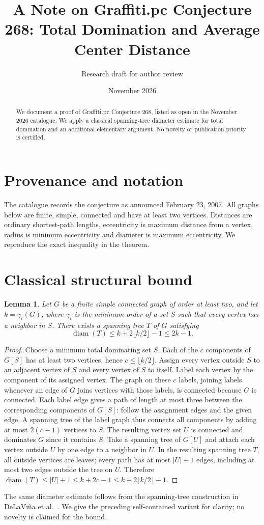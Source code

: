 \documentclass[11pt]{article}
\title{A Note on Graffiti.pc Conjecture 268: Total Domination and Average Center Distance}
\author{Research draft for author review}
\date{November 2026}
\newtheorem{lemma}{Lemma}
\begin{document}
\maketitle
\begin{abstract}
We document a proof of Graffiti.pc Conjecture 268, listed as open in the November 2026 catalogue. We apply a classical spanning-tree diameter estimate for total domination and an additional elementary argument. No novelty or publication priority is certified.
\end{abstract}
\section{Provenance and notation}
The catalogue \cite{wow} records the conjecture as announced February 23, 2007. All graphs below are finite, simple, connected and have at least two vertices. Distances are ordinary shortest-path lengths, eccentricity is maximum distance from a vertex, radius is minimum eccentricity and diameter is maximum eccentricity. We reproduce the exact inequality in the theorem.
\section{Classical structural bound}
\begin{lemma}
Let $G$ be a finite simple connected graph of order at least two, and let $k=\gamma_t(G)$, where $\gamma_t$ is the minimum order of a set $S$ such that every vertex has a neighbor in $S$. There exists a spanning tree $T$ of $G$ satisfying
\[
 \operatorname{diam}(T)\le k+2\lfloor k/2\rfloor-1\le 2k-1.
\]
\end{lemma}
\begin{proof}
Choose a minimum total dominating set $S$. Each of the $c$ components of $G[S]$ has at least two vertices, hence $c\le\lfloor k/2\rfloor$. Assign every vertex outside $S$ to an adjacent vertex of $S$ and every vertex of $S$ to itself. Label each vertex by the component of its assigned vertex. The graph on these $c$ labels, joining labels whenever an edge of $G$ joins vertices with those labels, is connected because $G$ is connected. Each label edge gives a path of length at most three between the corresponding components of $G[S]$: follow the assignment edges and the given edge. A spanning tree of the label graph thus connects all components by adding at most $2(c-1)$ vertices to $S$. The resulting vertex set $U$ is connected and dominates $G$ since it contains $S$. Take a spanning tree of $G[U]$ and attach each vertex outside $U$ by one edge to a neighbor in $U$. In the resulting spanning tree $T$, all outside vertices are leaves; every path has at most $|U|+1$ edges, including at most two edges outside the tree on $U$. Therefore $\operatorname{diam}(T)\le |U|+1\le k+2c-1\le k+2\lfloor k/2\rfloor-1$.
\end{proof}
The same diameter estimate follows from the spanning-tree construction in DeLaVi\~na et al.\ \cite[Lemmas 2--3, equation (5)]{prior}. We give the preceding self-contained variant for clarity; no novelty is claimed for the bound.
\end{document}
